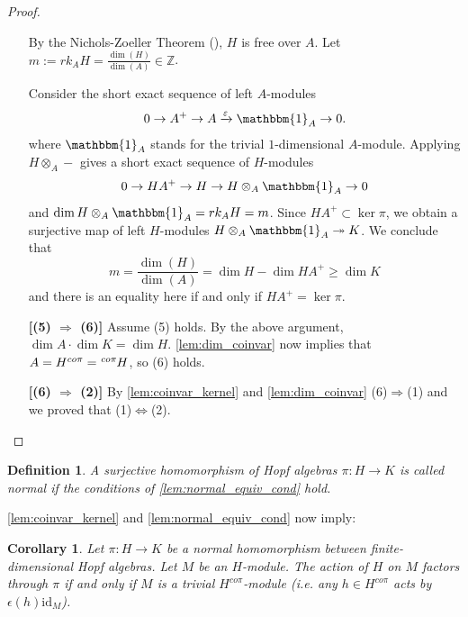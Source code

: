 \documentclass{amsart}
\theoremstyle{plain}%
\newtheorem{corollary}[lemma]{Corollary}
\newtheorem{definition}[lemma]{Definition}
\theoremstyle{remark}
\newcommand{\1}{\mathbbm{1}}
\newcommand{\Z}{\mathbb{Z}}
\newcommand{\id}{\mathrm{id}}
\newcommand{\eps}{\epsilon}
\newcommand{\prescr}[2]{\tensor*[^{#1}]{#2}{}}
\begin{document}
\begin{proof}
\begin{enumerate}
By the Nichols-Zoeller Theorem (\cite{NZ}), $H$ is free over $A$. Let $m:=  rk_A H=\frac{\dim(H)}{\dim(A)} \in \Z$.

Consider the short exact sequence of left $A$-modules
        $$
            0\to A^+\to A\xrightarrow{\varepsilon} \1_A\to 0.
        $$ where $\1_A $ stands for the trivial $1$-dimensional $A$-module.
        Applying $H\otimes_A-$ gives a short exact sequence of $H$-modules
        $$
            0\to H A^+\to H\to H\otimes_A \1_A\to 0
        $$
        and $\dim H\otimes_A \1_A = rk_A H=m$. Since $ HA^+\subset \ker\pi$, we obtain a surjective map of left $H$-modules $ H\otimes_A \1_A\twoheadrightarrow K$.  
     We conclude that $$ m = \frac{\dim(H)}{\dim(A)}=\dim H-\dim HA^+ \geq  \dim K$$ and there is an equality here if and only if $HA^+= \ker\pi $.    
      \item[\textbf{[(5) $\Longrightarrow$ (6)]}] 
      Assume (5) holds. By the above argument, $\dim A \cdot \dim K=\dim H$. \cref{lem:dim_coinvar} now implies that $A= H^{co \pi} =\prescr{co\pi}{H}$, so (6) holds. 
     
 \item[\textbf{[(6) $\Longrightarrow$ (2)]}] By \cref{lem:coinvar_kernel} and \cref{lem:dim_coinvar} (6)$\Longrightarrow$(1) and we proved that (1)$\Leftrightarrow$(2).
      
  
\end{enumerate}
\end{proof}


\begin{definition}
      A surjective homomorphism of Hopf algebras $\pi:H\to K$ is called {\it normal} if the conditions of \cref{lem:normal_equiv_cond} hold.
\end{definition}
\cref{lem:coinvar_kernel} and \cref{lem:normal_equiv_cond} now imply:
\begin{corollary}
     Let $\pi:H\to K$ be a normal homomorphism between finite-dimensional Hopf algebras. Let $M$ be an $H$-module. The action of $H$ on $M$ factors through $\pi$ if and only if $M$ is a trivial $H^{co \pi}$-module (i.e. any $h\in H^{co \pi}$ acts by $\eps(h)\id_M$). 
\end{corollary}
\end{document}
